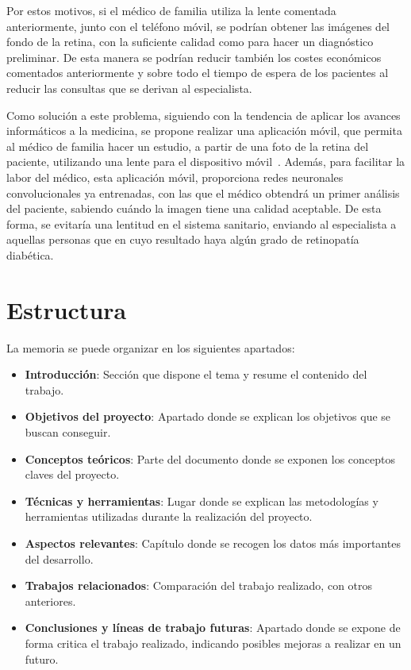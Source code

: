 Por estos motivos, si el médico de familia utiliza la lente comentada anteriormente, junto con el teléfono móvil, se podrían obtener las imágenes del fondo de la retina, con la suficiente calidad como para hacer un diagnóstico preliminar. De esta manera se podrían reducir también los costes económicos comentados anteriormente y sobre todo el tiempo de espera de los pacientes al reducir las consultas que se derivan al especialista.


Como solución a este problema, siguiendo con la tendencia de aplicar los avances informáticos a la medicina, se propone realizar una aplicación móvil, que permita al médico de familia hacer un estudio, a partir de una foto de la retina del paciente, utilizando una lente para el dispositivo móvil~\cite{d-eyecare-lente}.
Además, para facilitar la labor del médico, esta aplicación móvil, proporciona redes neuronales convolucionales ya entrenadas, con las que el médico obtendrá un primer análisis del paciente, sabiendo cuándo la imagen tiene una calidad aceptable. De esta forma, se evitaría una lentitud en el sistema sanitario, enviando al especialista a aquellas personas que en cuyo resultado haya algún grado de retinopatía diabética. 
 

\section{Estructura}
La memoria se puede organizar en los siguientes apartados:
\begin{itemize}
    \item \textbf{Introducción}: Sección que dispone el tema y resume el contenido del trabajo.
    \item \textbf{Objetivos del proyecto}: Apartado donde se explican los objetivos que se buscan conseguir.
    \item \textbf{Conceptos teóricos}: Parte del documento donde se exponen los conceptos claves del proyecto.
    \item \textbf{Técnicas y herramientas}: Lugar donde se explican las metodologías y herramientas utilizadas durante la realización del proyecto.
    \item \textbf{Aspectos relevantes}: Capítulo donde se recogen los datos más importantes del desarrollo.
    \item \textbf{Trabajos relacionados}: Comparación del trabajo realizado, con otros anteriores.
    \item \textbf{Conclusiones y líneas de trabajo futuras}: Apartado donde se expone de forma critica el trabajo realizado, indicando posibles mejoras a realizar en un futuro.
\end{itemize}

